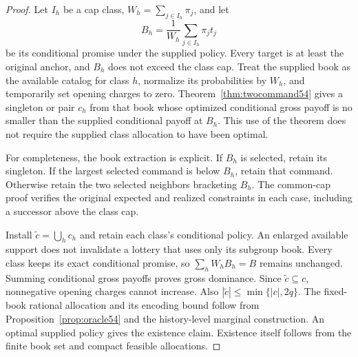 \begin{proof}
Let $I_h$ be a cap class, $W_h=\sum_{j\in I_h}\pi_j$, and let
\[
 B_h=\frac{1}{W_h}\sum_{j\in I_h}\pi_jt_j
\]
be its conditional promise under the supplied policy. Every target is at least the original anchor, and $B_h$ does not exceed the class cap. Treat the supplied book as the available catalog for class $h$, normalize its probabilities by $W_h$, and temporarily set opening charges to zero. Theorem~\ref{thm:twocommand54} gives a singleton or pair $c_h$ from that book whose optimized conditional gross payoff is no smaller than the supplied conditional payoff at $B_h$. This use of the theorem does not require the supplied class allocation to have been optimal.

For completeness, the book extraction is explicit. If $B_h$ is selected, retain its singleton. If the largest selected command is below $B_h$, retain that command. Otherwise retain the two selected neighbors bracketing $B_h$. The common-cap proof verifies the original expected and realized constraints in each case, including a successor above the class cap.

Install $\widetilde c=\bigcup_h c_h$ and retain each class's conditional policy. An enlarged available support does not invalidate a lottery that uses only its subgroup book. Every class keeps its exact conditional promise, so $\sum_hW_hB_h=B$ remains unchanged. Summing conditional gross payoffs proves gross dominance. Since $\widetilde c\subseteq c$, nonnegative opening charges cannot increase. Also $|\widetilde c|\leq\min\{|c|,2q\}$. The fixed-book rational allocation and its encoding bound follow from Proposition~\ref{prop:oracle54} and the history-level marginal construction. An optimal supplied policy gives the existence claim. Existence itself follows from the finite book set and compact feasible allocations.
\end{proof}


